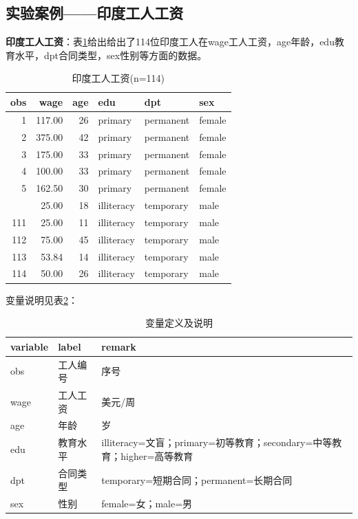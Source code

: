\documentclass[12pt,(landscape,a4paper),(portrait,a4paper)]{article}
\theoremstyle{definition}
\theoremstyle{definition}
\theoremstyle{definition}
\theoremstyle{remark}
\begin{document}
\subsection{实验案例------印度工人工资}

\textbf{印度工人工资}：表\ref{tab:data-worker}给出给出了114位印度工人在wage工人工资，age年龄，edu教育水平，dpt合同类型，sex性别等方面的数据。

\begin{table}

\caption{\label{tab:data-worker}印度工人工资(n=114)}
\centering
\begin{tabular}[t]{rrrlll}
\toprule
obs & wage & age & edu & dpt & sex\\
\midrule
1 & 117.00 & 26 & primary & permanent & female\\
2 & 375.00 & 42 & primary & permanent & female\\
3 & 175.00 & 33 & primary & permanent & female\\
4 & 100.00 & 33 & primary & permanent & female\\
5 & 162.50 & 30 & primary & permanent & female\\
\addlinespace
110 & 25.00 & 18 & illiteracy & temporary & male\\
111 & 25.00 & 11 & illiteracy & temporary & male\\
112 & 75.00 & 45 & illiteracy & temporary & male\\
113 & 53.84 & 14 & illiteracy & temporary & male\\
114 & 50.00 & 26 & illiteracy & temporary & male\\
\bottomrule
\end{tabular}
\end{table}

变量说明见表\ref{tab:label-worker}：

\begin{table}

\caption{\label{tab:label-worker}变量定义及说明}
\centering
\begin{tabular}[t]{l|l|l}
\hline
variable & label & remark\\
\hline
obs & 工人编号 & 序号\\
\hline
wage & 工人工资 & 美元/周\\
\hline
age & 年龄 & 岁\\
\hline
edu & 教育水平 & illiteracy=文盲；primary=初等教育；secondary=中等教育；higher=高等教育\\
\hline
dpt & 合同类型 & temporary=短期合同；permanent=长期合同\\
\hline
sex & 性别 & female=女；male=男\\
\hline
\end{tabular}
\end{table}
\end{document}
